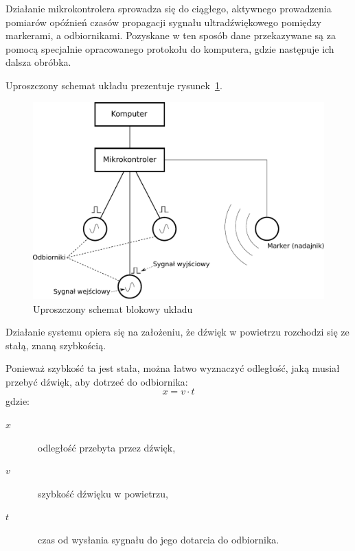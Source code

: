 Działanie mikrokontrolera sprowadza się do ciągłego, aktywnego prowadzenia pomiarów opóźnień czasów propagacji sygnału ultradźwiękowego pomiędzy markerami, a odbiornikami. Pozyskane w ten sposób dane przekazywane są za pomocą specjalnie opracowanego protokołu do komputera, gdzie następuje ich dalsza obróbka.

Uproszczony schemat układu prezentuje rysunek~\ref{fig:device_scheme}.

\begin{figure}
 \includegraphics[width=\textwidth]{gfx/diagramy/schemat_blokowy_ukladu}
 \caption{Uproszczony schemat blokowy układu}
 \label{fig:device_scheme}
\end{figure}

Działanie systemu opiera się na założeniu, że dźwięk w powietrzu rozchodzi się ze stałą, znaną szybkością.

Ponieważ szybkość ta jest stała, można łatwo wyznaczyć odległość, jaką musiał przebyć dźwięk, aby dotrzeć do odbiornika:
\begin{equation}
 x = v \cdot t
 \label{eq:sound_distance}
\end{equation}
gdzie:
\begin{description}
 \item[$x$] \ppauza~odległość przebyta przez dźwięk,
 \item[$v$] \ppauza~szybkość dźwięku w powietrzu,
 \item[$t$] \ppauza~czas od wysłania sygnału do jego dotarcia do odbiornika. 
\end{description}


